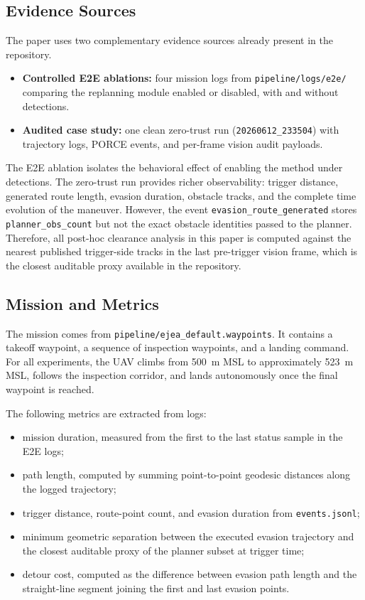 \documentclass[journal,twoside,web]{ieeecolor}
\begin{document}
\subsection{Evidence Sources}

The paper uses two complementary evidence sources already present in the repository.

\begin{itemize}

    \item \textbf{Controlled E2E ablations:} four mission logs from \texttt{pipeline/logs/e2e/} comparing the replanning module enabled or disabled, with and without detections.
    \item \textbf{Audited case study:} one clean zero-trust run (\texttt{20260612\_233504}) with trajectory logs, PORCE events, and per-frame vision audit payloads.
\end{itemize}

The E2E ablation isolates the behavioral effect of enabling the method under detections. The zero-trust run provides richer observability: trigger distance, generated route length, evasion duration, obstacle tracks, and the complete time evolution of the maneuver. However, the event \texttt{evasion\_route\_generated} stores \texttt{planner\_obs\_count} but not the exact obstacle identities passed to the planner. Therefore, all post-hoc clearance analysis in this paper is computed against the nearest published trigger-side tracks in the last pre-trigger vision frame, which is the closest auditable proxy available in the repository.

\subsection{Mission and Metrics}

The mission comes from \texttt{pipeline/ejea\_default.waypoints}. It contains a takeoff waypoint, a sequence of inspection waypoints, and a landing command. For all experiments, the UAV climbs from \SI{500}{\meter} MSL to approximately \SI{523}{\meter} MSL, follows the inspection corridor, and lands autonomously once the final waypoint is reached.

The following metrics are extracted from logs:
\begin{itemize}
    \item mission duration, measured from the first to the last status sample in the E2E logs;
    \item path length, computed by summing point-to-point geodesic distances along the logged trajectory;
    \item trigger distance, route-point count, and evasion duration from \texttt{events.jsonl};
    \item minimum geometric separation between the executed evasion trajectory and the closest auditable proxy of the planner subset at trigger time;
    \item detour cost, computed as the difference between evasion path length and the straight-line segment joining the first and last evasion points.
\end{itemize}
\end{document}
